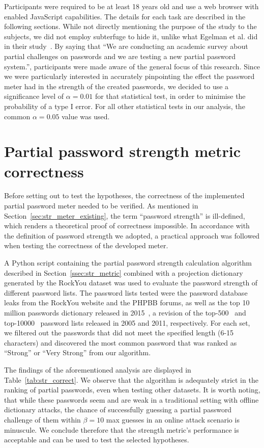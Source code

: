 Participants were required to be at least 18 years old and use a web browser with enabled JavaScript capabilities. The details for each task are described in the following sections. While not directly mentioning the purpose of the study to the subjects, we did not employ subterfuge to hide it, unlike what Egelman et al. did in their study~\cite{strength_meter_impact}. By saying that ``We are conducting an academic survey about partial challenges on passwords and we are testing a new partial password system.'', participants were made aware of the general focus of this research. Since we were particularly interested in accurately pinpointing the effect the password meter had in the strength of the created passwords, we decided to use a significance level of $\alpha = 0.01$ for that statistical test, in order to minimise the probability of a type I error. For all other statistical tests in our analysis, the common $\alpha = 0.05$ value was used.

\section{Partial password strength metric correctness}
  \label{sec:correctness}
  Before setting out to test the hypotheses, the correctness of the implemented partial password meter needed to be verified. As mentioned in Section~\ref{sec:str_meter_existing}, the term ``password strength'' is ill-defined, which renders a theoretical proof of correctness impossible. In accordance with the definition of password strength we adopted, a practical approach was followed when testing the correctness of the developed meter.

  A Python script containing the partial password strength calculation algorithm described in Section~\ref{ssec:str_metric} combined with a projection dictionary generated by the RockYou dataset was used to evaluate the password strength of different password lists. The password lists tested were the password database leaks from the RockYou website and the PHPBB forums, as well as the top 10 million passwords dictionary released in 2015~\cite{top10m_pass}, a revision of the top-500~\cite{top500_pass} and top-10000~\cite{top10000_pass} password lists released in 2005 and 2011, respectively. For each set, we filtered out the passwords that did not meet the specified length (6-15 characters) and discovered the most common password that was ranked as ``Strong'' or ``Very Strong'' from our algorithm.

  The findings of the aforementioned analysis are displayed in Table~\ref{tab:str_correct}. We observe that the algorithm is adequately strict in the ranking of partial passwords, even when testing other datasets. It is worth noting, that while these passwords seem and are weak in a traditional setting with offline dictionary attacks, the chance of successfully guessing a partial password challenge of them within $\beta = 10$ max guesses in an online attack scenario is minuscule. We conclude therefore that the strength metric's performance is acceptable and can be used to test the selected hypotheses.

